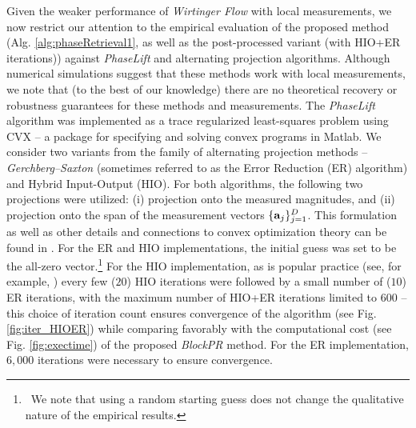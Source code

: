 Given the weaker performance of {\em Wirtinger Flow} with local measurements, we now restrict our attention to the empirical evaluation of the proposed method (Alg. \ref{alg:phaseRetrieval1}, as well as the post-processed variant (with HIO+ER iterations)) against {\em PhaseLift} and alternating projection algorithms. Although numerical simulations suggest that these methods work with local measurements, we note that (to the best of our knowledge) there are no theoretical recovery or robustness guarantees for these methods and measurements.  The {\em PhaseLift} algorithm was implemented as a trace regularized least-squares problem using CVX \cite{cvx,gb08} -- a package for specifying and solving convex programs in Matlab. We consider two variants from the family of alternating projection methods -- {\em Gerchberg--Saxton} (sometimes referred to as the Error Reduction (ER) algorithm) and Hybrid Input-Output (HIO). For both algorithms, the following two projections were utilized: (i) projection onto the measured magnitudes, and (ii) projection onto the span of the measurement vectors $\{\mathbf a_j\}_{j=1}^D$. This formulation as well as other details and connections to convex optimization theory can be found in \cite{bauschke2002phase}. For the ER and HIO implementations, the initial guess was set to be the all-zero vector.\footnote{\ We note that using a random starting guess does not change the qualitative nature of the empirical results.} For the HIO implementation, as is popular practice (see, for example, \cite{fienup1982comparison}) every few ($20$) HIO iterations were followed by a small number of ($10$) ER iterations, with the maximum number of HIO+ER iterations limited to $600$ -- this choice of iteration count ensures convergence of the algorithm (see Fig. \ref{fig:iter_HIOER}) while comparing favorably with the computational cost (see Fig. \ref{fig:exectime}) of the proposed {\em BlockPR} method. For the ER implementation, $6,000$ iterations were necessary to ensure convergence.

